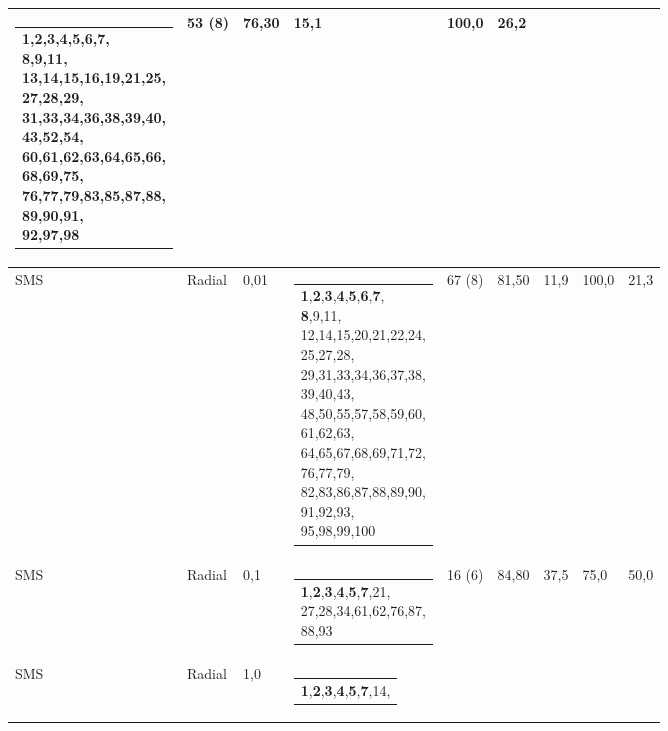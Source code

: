 \documentclass[12pt,a4paper]{article}
\makeatletter
\newcommand{\makecell}[2][t]{\begin{tabular}[#1]{@{}l@{}}#2\end{tabular}}
\newcommand{\novo}[1]{\textcolor{corNova}{#1}}
\makeatother
\begin{document}
\begin{longtable}{L{1.3cm}|L{1.3cm}|C{0.8cm}|L{4.8cm}|C{1.55cm}|C{0.95cm}|C{0.95cm}|C{0.9cm}|C{1.05cm}}
  \novo{\makecell[l]{\textbf{1},\textbf{2},\textbf{3},\textbf{4},\textbf{5},\textbf{6},\textbf{7},\\
               \textbf{8},9,11,\\
               13,14,15,16,19,21,25,\\
               27,28,29,\\
               31,33,34,36,38,39,40,\\
               43,52,54,\\
               60,61,62,63,64,65,66,\\
               68,69,75,\\
               76,77,79,83,85,87,88,\\
               89,90,91,\\
               92,97,98}} &
  \novo{53 (8)} & \novo{76,30} & \novo{15,1} & \novo{100,0} & \novo{26,2} \\
\hline
\novo{SMS} & \novo{Radial} & \novo{0,01} &
  \novo{\makecell[l]{\textbf{1},\textbf{2},\textbf{3},\textbf{4},\textbf{5},\textbf{6},\textbf{7},\\
               \textbf{8},9,11,\\
               12,14,15,20,21,22,24,\\
               25,27,28,\\
               29,31,33,34,36,37,38,\\
               39,40,43,\\
               48,50,55,57,58,59,60,\\
               61,62,63,\\
               64,65,67,68,69,71,72,\\
               76,77,79,\\
               82,83,86,87,88,89,90,\\
               91,92,93,\\
               95,98,99,100}} &
  \novo{67 (8)} & \novo{81,50} & \novo{11,9} & \novo{100,0} & \novo{21,3} \\
\hline
\novo{SMS} & \novo{Radial} & \novo{0,1} &
  \novo{\makecell[l]{\textbf{1},\textbf{2},\textbf{3},\textbf{4},\textbf{5},\textbf{7},21,\\
               27,28,34,61,62,76,87,\\
               88,93}} &
  \novo{16 (6)} & \novo{84,80} & \novo{37,5} & \novo{75,0} & \novo{50,0} \\
\hline
\novo{SMS} & \novo{Radial} & \novo{1,0} &
  \novo{\makecell[l]{\textbf{1},\textbf{2},\textbf{3},\textbf{4},\textbf{5},\textbf{7},14,\\
}}
\end{longtable}
\end{document}
